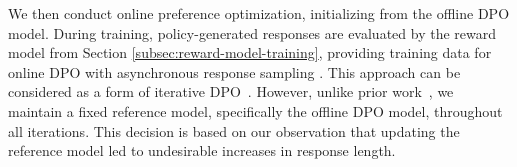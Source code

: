 We then conduct online preference optimization, initializing from the offline DPO model.
During training, policy-generated responses are evaluated by the reward model from Section \ref{subsec:reward-model-training}, providing training data for online DPO \citep{guo2024online-dpo} with asynchronous response sampling \citep{noukhovitch2024asynchronous-rlhf}.
This approach can be considered as a form of iterative DPO~\citep{xiong2024iterative-preference}.
However, unlike prior work~\citep{tran2023iterative-dpo-snorkel}, we maintain a fixed reference model, specifically the offline DPO model, throughout all iterations.
This decision is based on our observation that updating the reference model led to undesirable increases in response length.
